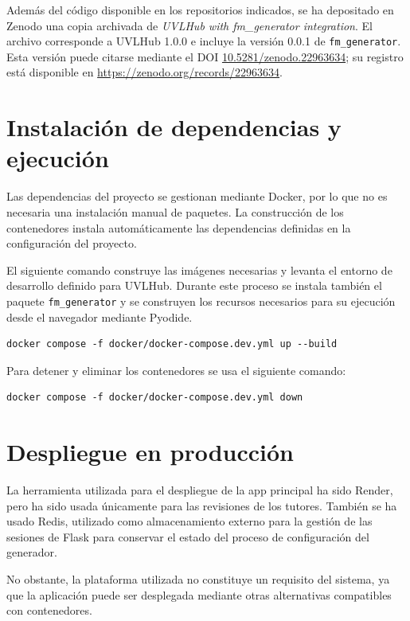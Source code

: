 Además del código disponible en los repositorios indicados, se ha depositado
en Zenodo una copia archivada de \textit{UVLHub with fm\_generator integration}.
El archivo corresponde a UVLHub 1.0.0 e incluye la versión 0.0.1 de
\texttt{fm\_generator}. Esta versión puede citarse mediante el DOI
\href{https://doi.org/10.5281/zenodo.22963634}{10.5281/zenodo.22963634};
su registro está disponible en
\url{https://zenodo.org/records/22963634}.

\section{Instalación de dependencias y ejecución}
\label{sec:instalacion_dependencias}


Las dependencias del proyecto se gestionan mediante Docker, por lo que no es
necesaria una instalación manual de paquetes. La construcción de los
contenedores instala automáticamente las dependencias definidas en la
configuración del proyecto.

El siguiente comando construye las imágenes necesarias y levanta el entorno de
desarrollo definido para UVLHub. Durante este proceso se instala también el
paquete \texttt{fm\_generator} y se construyen los recursos necesarios para su
ejecución desde el navegador mediante Pyodide.

\begin{verbatim}
docker compose -f docker/docker-compose.dev.yml up --build
\end{verbatim}

Para detener y eliminar los contenedores se usa el siguiente comando:

\begin{verbatim}
docker compose -f docker/docker-compose.dev.yml down
\end{verbatim}

\section{Despliegue en producción}
\label{sec:despliegue_produccion}


La herramienta utilizada para el despliegue de la app principal ha sido Render, pero ha sido usada únicamente para las revisiones de los tutores. También se ha usado Redis, utilizado como almacenamiento externo para la gestión de las
sesiones de Flask para conservar el estado
del proceso de configuración del generador.

No obstante, la plataforma utilizada no constituye un requisito del sistema,
ya que la aplicación puede ser desplegada mediante otras alternativas
compatibles con contenedores.


